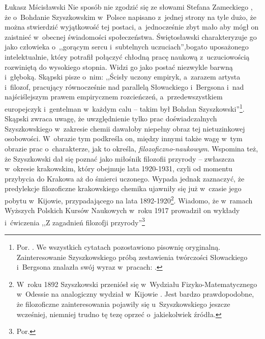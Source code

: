 \begin{artplenv}{Łukasz Mścisławski}
Nie sposób nie zgodzić się ze słowami Stefana Zameckiego
\parencite*[][s.~149]{zamecki_bohdan_1998}, %
 że o~Bohdanie Szyszkowskim w~Polsce napisano z~jednej strony na tyle dużo, że można stwierdzić wyjątkowość tej postaci, a~jednocześnie zbyt mało aby mógł on zaistnieć w~obecnej świadomości społeczeństwa. Świętosławski 
\parencite*[][]{swietoslawski_sp_1931} %
 charakteryzuje go jako człowieka o~,,gorącym sercu i~subtelnych uczuciach'',bogato uposażonego intelektualnie, który potrafił połączyć chłodną pracę naukową z~uczuciowością rozwiniętą do wysokiego stopnia. Widzi go jako postać niezwykle barwną i~głęboką. Skąpski pisze o~nim: ,,Ścisły uczony empiryk, a~zarazem artysta i~filozof, pracujący równocześnie nad parallelą Słowackiego i~Bergsona i~nad najściślejszym prawem empirycznem rozcieńczeń, a~przedewszystkiem europejczyk i~gentelman w~każdym calu -- takim był Bohdan Szyszkowski''\footnote{Por. 
\parencite[][]{skapski_charakterystyka_1931}. %
 We wszystkich cytatach pozostawiono pisownię oryginalną. Zainteresowanie Szyszkowskiego próbą zestawienia twórczości Słowackiego i~Bergsona znalazła swój wyraz w~pracach: 
\parencites[][]{szyszkowski_slowacki_1920-1}[][]{szyszkowski_slowacki_1920}[][]{szyszkowski_slowacki_1920-2}[][]{szyszkowski_slowacki_1921}.%
}. Skąpski zwraca uwagę, że uwzględnienie tylko prac doświadczalnych Szyszkowskiego w~zakresie chemii dawałoby niepełny obraz tej nietuzinkowej osobowości. W~obrazie tym podkreśla on, między innymi także wagę w~tym obrazie prac o~charakterze, jak to określa, \textit{filozoficzno-naukowym}. Wspomina też, że Szyszkowski dał się poznać jako miłośnik filozofii przyrody -- zwłaszcza w~okresie krakowskim, który obejmuje lata 1920-1931, czyli od momentu przybycia do Krakowa aż do śmierci uczonego. Wypada jednak zaznaczyć, że predylekcje filozoficzne krakowskiego chemika ujawniły się już w~czasie jego pobytu w~Kijowie, przypadającego na lata 1892-1920\footnote{W~roku 1892 Szyszkowski przeniósł się w~Wydziału Fizyko-Matematycznego w~Odessie na analogiczny wydział w~Kijowie 
\parencite[][]{sroka_szyszkowski_2002}. %
 Jest bardzo prawdopodobne, że filozoficzne zainteresowania pojawiły się u~Szyszkowskiego jeszcze wcześniej, niemniej trudno tę tezę oprzeć o~jakiekolwiek źródła.}. Wiadomo, że w~ramach Wyższych Polskich Kursów Naukowych w~roku 1917 prowadził on wykłady i~ćwiczenia ,,Z zagadnień filozofji przyrody''\footnote{Por. 
}
\end{artplenv}
